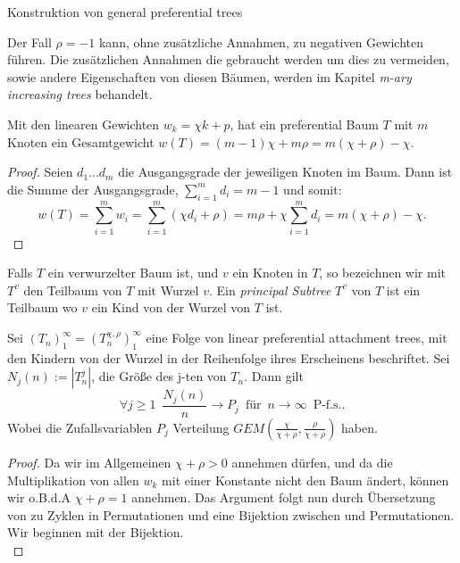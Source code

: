 \begin{section}{Konstruktion von general preferential trees}
\begin{enumerate}
\end{enumerate}
\begin{Bemerkung}
    Der Fall $\rho = -1$ kann, ohne zusätzliche Annahmen, zu negativen Gewichten führen. Die zusätzlichen Annahmen die gebraucht werden um dies zu vermeiden, sowie andere Eigenschaften von diesen Bäumen, werden im Kapitel \textit{m-ary increasing trees} behandelt.
\end{Bemerkung}
\begin{theorem}
\cite[Lemma 3.1]{janson2019random}
\label{Gewichte Satz}
   Mit den linearen Gewichten $w_k = \chi k + p $, hat ein preferential Baum $T$ mit $m$ Knoten ein Gesamtgewicht $w(T) = (m-1)\chi + m\rho = m(\chi + \rho) - \chi$.
\end{theorem}
\begin{proof}
    Seien $d_1...d_m$ die Ausgangsgrade der jeweiligen Knoten im Baum. Dann ist die Summe der Ausgangsgrade, $\sum_{i=1}^{m}d_i = m-1$ und somit:
    \[
     w(T) = \sum_{i=1}^{m}w_i = \sum_{i=1}^{m} (\chi d_i + \rho) = m \rho + \chi \sum_{i = 1}^{m} d_i = m(\chi + \rho) - \chi.
    \]
\end{proof}
\begin{Definition}
    Falls $T$ ein verwurzelter Baum ist, und $v$ ein Knoten in $T$, so bezeichnen wir mit $T^v$ den Teilbaum von $T$ mit Wurzel $v$. Ein \textit{principal Subtree} $T^v$ von $T$ ist ein Teilbaum wo $v$ ein Kind von der Wurzel von $T$ ist.
\end{Definition}
\begin{theorem} \cite[Theorem 3.2]{janson2019random}
    \label{linpreft Grenzwert}
    Sei $(T_n)_1^\infty =(T_n^{\chi,\rho})_1^\infty$ eine Folge von linear preferential attachment trees, mit den Kindern von der Wurzel in der Reihenfolge ihres Erscheinens beschriftet. Sei $N_j(n) := |T^j_n|$, die Größe des j-ten \PsubT von $T_n$. Dann gilt 
    \[ 
        \forall j \geq 1  \hspace{6pt} \frac{N_j(n)}{n}  \rightarrow P_j \hspace{6pt} \text{für} \hspace{6pt} n \rightarrow \infty \hspace{6pt} \text{P-f.s.}.
  \]
Wobei die Zufallsvariablen  $P_j$ Verteilung $GEM(\frac{\chi}{\chi+\rho},{\frac{\rho}{\chi+\rho}})$ haben.  
\end{theorem}
\begin{proof}
    Da wir im Allgemeinen $\chi + \rho > 0 $ annehmen dürfen, und da die Multiplikation von allen $w_k$ mit einer Konstante nicht den Baum ändert, können wir o.B.d.A   $\chi + \rho = 1 $ annehmen. Das Argument folgt nun durch Übersetzung von \PsubT zu Zyklen in Permutationen und eine Bijektion zwischen \linpreft und Permutationen. Wir beginnen mit der Bijektion. \\

\end{proof}
\end{section}
